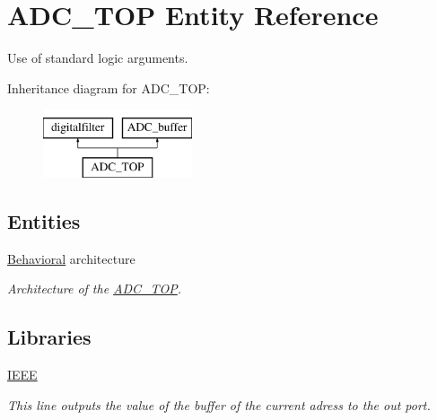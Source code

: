 \hypertarget{classADC__TOP}{\section{A\-D\-C\-\_\-\-T\-O\-P Entity Reference}
\label{classADC__TOP}
}


Use of standard logic arguments.  


Inheritance diagram for A\-D\-C\-\_\-\-T\-O\-P\-:\begin{figure}[H]
\begin{center}
\leavevmode
\includegraphics[height=2.000000cm]{classADC__TOP}
\end{center}
\end{figure}
\subsection*{Entities}
\begin{DoxyCompactItemize}
\item 
\hyperlink{classADC__TOP_1_1Behavioral}{Behavioral} architecture
\begin{DoxyCompactList}\small\item\em Architecture of the \hyperlink{classADC__TOP}{A\-D\-C\-\_\-\-T\-O\-P}. \end{DoxyCompactList}\end{DoxyCompactItemize}
\subsection*{Libraries}
 \begin{DoxyCompactItemize}
\item 
\hypertarget{classADC__TOP_ae4f03c286607f3181e16b9aa12d0c6d4}{\hyperlink{classADC__TOP_ae4f03c286607f3181e16b9aa12d0c6d4}{I\-E\-E\-E} }\label{classADC__TOP_ae4f03c286607f3181e16b9aa12d0c6d4}

\begin{DoxyCompactList}\small\item\em This line outputs the value of the buffer of the current adress to the out port. \end{DoxyCompactList}\end{DoxyCompactItemize}
